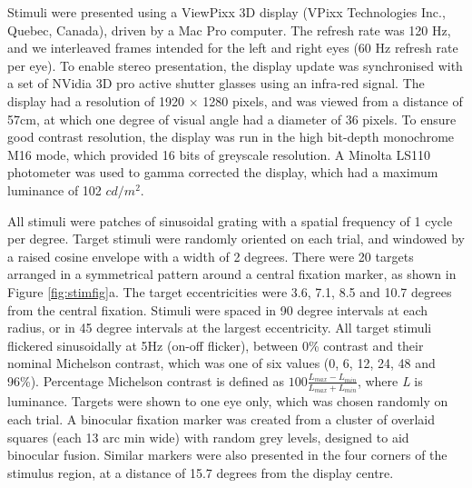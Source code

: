 \documentclass[]{article}
\begin{document}
Stimuli were presented using a ViewPixx 3D display (VPixx Technologies Inc., Quebec, Canada), driven by a Mac Pro computer. The refresh rate was 120 Hz, and we interleaved frames intended for the left and right eyes (60 Hz refresh rate per eye). To enable stereo presentation, the display update was synchronised with a set of NVidia 3D pro active shutter glasses using an infra-red signal. The display had a resolution of 1920 \(\times\) 1280 pixels, and was viewed from a distance of 57cm, at which one degree of visual angle had a diameter of 36 pixels. To ensure good contrast resolution, the display was run in the high bit-depth monochrome M16 mode, which provided 16 bits of greyscale resolution. A Minolta LS110 photometer was used to gamma corrected the display, which had a maximum luminance of 102 \(cd/m^2\).

All stimuli were patches of sinusoidal grating with a spatial frequency of 1 cycle per degree. Target stimuli were randomly oriented on each trial, and windowed by a raised cosine envelope with a width of 2 degrees. There were 20 targets arranged in a symmetrical pattern around a central fixation marker, as shown in Figure \ref{fig:stimfig}a. The target eccentricities were 3.6, 7.1, 8.5 and 10.7 degrees from the central fixation. Stimuli were spaced in 90 degree intervals at each radius, or in 45 degree intervals at the largest eccentricity. All target stimuli flickered sinusoidally at 5Hz (on-off flicker), between 0\% contrast and their nominal Michelson contrast, which was one of six values (0, 6, 12, 24, 48 and 96\%). Percentage Michelson contrast is defined as \(100\frac{L_{max}-L_{min}}{L_{max}+L_{min}}\), where \emph{L} is luminance. Targets were shown to one eye only, which was chosen randomly on each trial. A binocular fixation marker was created from a cluster of overlaid squares (each 13 arc min wide) with random grey levels, designed to aid binocular fusion. Similar markers were also presented in the four corners of the stimulus region, at a distance of 15.7 degrees from the display centre.
\end{document}
